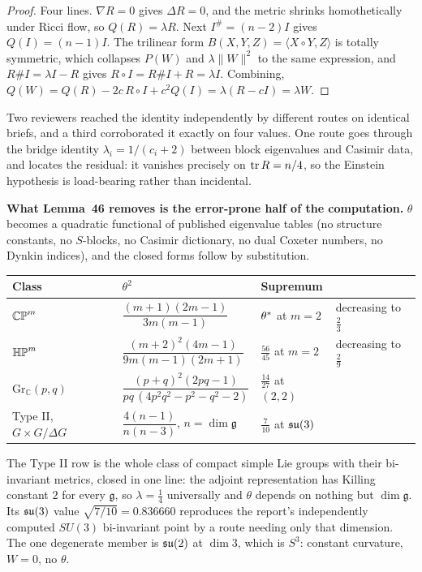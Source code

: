 \begin{proof}
Four lines. $\nabla R=0$ gives $\Delta R=0$, and the metric shrinks homothetically under Ricci flow, so $Q(R)=\lambda R$. Next $I^{\#}=(n-2)I$ gives $Q(I)=(n-1)I$. The trilinear form $B(X,Y,Z)=\langle X\circ Y,Z\rangle$ is totally symmetric, which collapses $P(W)$ and $\lambda\|W\|^2$ to the same expression, and $R\#I=\lambda I-R$ gives $R\circ I=R\#I+R=\lambda I$. Combining, $Q(W)=Q(R)-2c\,R\circ I+c^2Q(I)=\lambda(R-cI)=\lambda W$.
\end{proof}

\begin{certificate}
Two reviewers reached the identity independently by different routes on identical briefs, and a third corroborated it exactly on four values. One route goes through the bridge identity $\lambda_i=1/(c_i+2)$ between block eigenvalues and Casimir data, and locates the residual: it vanishes precisely on $\operatorname{tr} R=n/4$, so the Einstein hypothesis is load-bearing rather than incidental.
\end{certificate}

\textbf{What Lemma~46 removes is the error-prone half of the computation.} $\theta$ becomes a quadratic functional of published eigenvalue tables (no structure constants, no $S$-blocks, no Casimir dictionary, no dual Coxeter numbers, no Dynkin indices), and the closed forms follow by substitution.

\begin{center}
\begin{tabular}{@{}llll@{}}
\toprule
\textbf{Class} & \textbf{$\theta^2$} & \textbf{Supremum} & \\
\midrule
$\mathbb{CP}^m$ & $\dfrac{(m+1)(2m-1)}{3m(m-1)}$ & $\theta^{*}$ at $m=2$ & decreasing to $\tfrac23$ \\[6pt]
$\mathbb{HP}^m$ & $\dfrac{(m+2)^2(4m-1)}{9m(m-1)(2m+1)}$ & $\tfrac{56}{45}$ at $m=2$ & decreasing to $\tfrac29$ \\[6pt]
$\mathrm{Gr}_{\mathbb C}(p,q)$ & $\dfrac{(p+q)^2(2pq-1)}{pq\,(4p^2q^2-p^2-q^2-2)}$ & $\tfrac{14}{27}$ at $(2,2)$ & \\[6pt]
Type II, $G\times G/\Delta G$ & $\dfrac{4(n-1)}{n(n-3)}$, $n=\dim\mathfrak g$ & $\tfrac7{10}$ at $\mathfrak{su}(3)$ & \\
\bottomrule
\end{tabular}
\end{center}

\noindent The Type II row is the whole class of compact simple Lie groups with their bi-invariant metrics, closed in one line: the adjoint representation has Killing constant $2$ for every $\mathfrak g$, so $\lambda=\tfrac14$ universally and $\theta$ depends on nothing but $\dim\mathfrak g$. Its $\mathfrak{su}(3)$ value $\sqrt{7/10}=0.836660$ reproduces the report's independently computed $SU(3)$ bi-invariant point by a route needing only that dimension. The one degenerate member is $\mathfrak{su}(2)$ at $\dim3$, which is $S^3$: constant curvature, $W=0$, no $\theta$.

